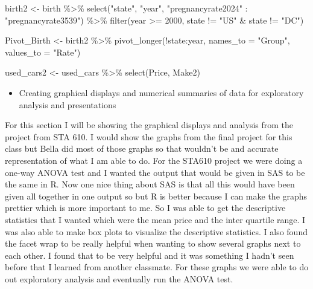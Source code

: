 \documentclass[
]{article}
\newenvironment{Shaded}{\begin{snugshade}}{\end{snugshade}}
\newcommand{\AttributeTok}[1]{\textcolor[rgb]{0.77,0.63,0.00}{#1}}
\newcommand{\DecValTok}[1]{\textcolor[rgb]{0.00,0.00,0.81}{#1}}
\newcommand{\FunctionTok}[1]{\textcolor[rgb]{0.00,0.00,0.00}{#1}}
\newcommand{\NormalTok}[1]{#1}
\newcommand{\OtherTok}[1]{\textcolor[rgb]{0.56,0.35,0.01}{#1}}
\newcommand{\SpecialCharTok}[1]{\textcolor[rgb]{0.00,0.00,0.00}{#1}}
\newcommand{\StringTok}[1]{\textcolor[rgb]{0.31,0.60,0.02}{#1}}
\providecommand{\tightlist}{%
  \setlength{\itemsep}{0pt}\setlength{\parskip}{0pt}}
\begin{document}
\begin{Shaded}
\begin{Highlighting}[]
\NormalTok{birth2 }\OtherTok{\textless{}{-}}\NormalTok{ birth }\SpecialCharTok{\%\textgreater{}\%}
  \FunctionTok{select}\NormalTok{(}\StringTok{"state"}\NormalTok{, }\StringTok{"year"}\NormalTok{, }\StringTok{"pregnancyrate2024"} \SpecialCharTok{:} \StringTok{"pregnancyrate3539"}\NormalTok{) }\SpecialCharTok{\%\textgreater{}\%}
  \FunctionTok{filter}\NormalTok{(year }\SpecialCharTok{\textgreater{}=} \DecValTok{2000}\NormalTok{, state }\SpecialCharTok{!=} \StringTok{"US"} \SpecialCharTok{\&}\NormalTok{ state }\SpecialCharTok{!=} \StringTok{"DC"}\NormalTok{) }

\NormalTok{Pivot\_Birth }\OtherTok{\textless{}{-}}\NormalTok{ birth2 }\SpecialCharTok{\%\textgreater{}\%}
  \FunctionTok{pivot\_longer}\NormalTok{(}\SpecialCharTok{!}\NormalTok{state}\SpecialCharTok{:}\NormalTok{year, }\AttributeTok{names\_to =} \StringTok{"Group"}\NormalTok{, }\AttributeTok{values\_to =} \StringTok{"Rate"}\NormalTok{)}

\NormalTok{used\_cars2 }\OtherTok{\textless{}{-}}\NormalTok{ used\_cars }\SpecialCharTok{\%\textgreater{}\%}
  \FunctionTok{select}\NormalTok{(Price, Make2)}
\end{Highlighting}
\end{Shaded}

\begin{itemize}
\tightlist
\item
  Creating graphical displays and numerical summaries of data for
  exploratory analysis and presentations
\end{itemize}

For this section I will be showing the graphical displays and analysis
from the project from STA 610. I would show the graphs from the final
project for this class but Bella did most of those graphs so that
wouldn't be and accurate representation of what I am able to do. For the
STA610 project we were doing a one-way ANOVA test and I wanted the
output that would be given in SAS to be the same in R. Now one nice
thing about SAS is that all this would have been given all together in
one output so but R is better because I can make the graphs prettier
which is more important to me. So I was able to get the descriptive
statistics that I wanted which were the mean price and the inter
quartile range. I was also able to make box plots to visualize the
descriptive statistics. I also found the facet wrap to be really helpful
when wanting to show several graphs next to each other. I found that to
be very helpful and it was something I hadn't seen before that I learned
from another classmate. For these graphs we were able to do out
exploratory analysis and eventually run the ANOVA test.
\end{document}
